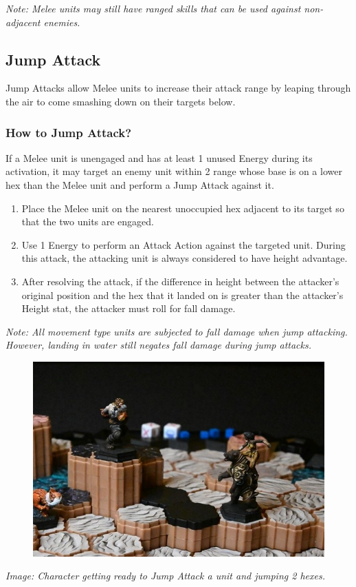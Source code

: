 \documentclass[../main.tex]{subfiles}
\begin{document}
\textit{Note: Melee units may still have ranged skills that can be used against non-adjacent enemies.}

\subsection{Jump Attack}
Jump Attacks allow Melee units to increase their attack range by leaping through the air to come smashing down on their targets below.

\subsubsection{How to Jump Attack? }
If a Melee unit is unengaged and has at least 1 unused Energy during its activation, it may target an enemy unit within 2 range whose base is on a lower hex than the Melee unit and perform a Jump Attack against it.

\begin{enumerate}
    \item Place the Melee unit on the nearest unoccupied hex adjacent to its target so that the two units are engaged.
    \item Use 1 Energy to perform an Attack Action against the targeted unit. During this attack, the attacking unit is always considered to have height advantage.
    \item After resolving the attack, if the difference in height between the attacker’s original position and the hex that it landed on is greater than the attacker’s Height stat, the attacker must roll for fall damage.
\end{enumerate}

\textit{Note: All movement type units are subjected to fall damage when jump attacking. However, landing in water still negates fall damage during jump attacks.}

\begin{figure}[h]
    \centering
    \includegraphics[width=1\linewidth]{chapters//TargetingandCombat/TimeStrikeJumpAttack1.jpg}
\end{figure}
\textit{Image: Character getting ready to Jump Attack a unit and jumping 2 hexes.}
\end{document}
